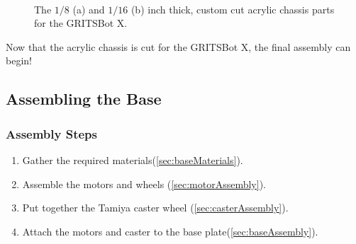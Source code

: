 \begin{figure}[h!]
\centering
{}
\hfill
{}\\
\caption{The $1/8$ (a) and $1/16$ (b) inch thick, custom cut acrylic chassis parts for the GRITSBot X.}
\label{fig:acrylicChassisCuts}
\end{figure}

Now that the acrylic chassis is cut for the GRITSBot X, the final assembly can begin!

\subsection{Assembling the Base}
\label{sec:base}

\subsubsection{Assembly Steps}
\begin{enumerate}
\item Gather the required materials(\cref{sec:baseMaterials}).
\item Assemble the motors and wheels (\cref{sec:motorAssembly}).
\item Put together the Tamiya caster wheel (\cref{sec:casterAssembly}).
\item Attach the motors and caster to the base plate(\cref{sec:baseAssembly}).
\end{enumerate}

